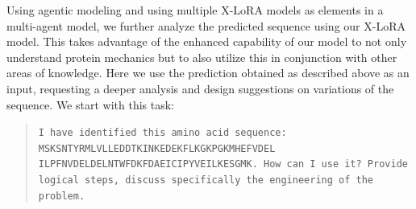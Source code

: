 \documentclass{article}
\begin{document}
Using agentic modeling and using multiple X-LoRA models as elements in a multi-agent model, we further analyze the predicted sequence using our X-LoRA model. This takes advantage of the enhanced capability of our model to not only understand protein mechanics but to also utilize this in conjunction with other areas of knowledge.  Here we use the prediction obtained as described above as an input, requesting a deeper analysis and design suggestions on variations of the sequence. We start with this task:
\begin{quote}
\small\texttt{I have identified this amino acid sequence: MSKSNTYRMLVLLEDDTKINKEDEKFLKGKPGKMHEFVDEL
ILPFNVDELDELNTWFDKFDAEICIPYVEILKESGMK. 
\newline\newline
How can I use it? 
\newline\newline
Provide logical steps, discuss specifically the engineering of the problem.
}
\end{quote}
\end{document}
